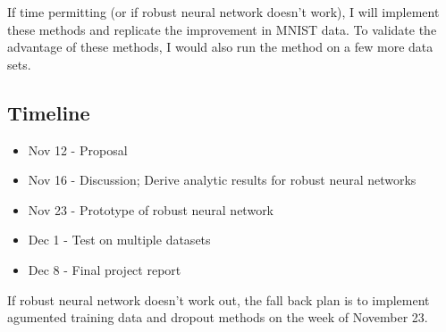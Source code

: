 \documentclass[twoside,12pt]{article}
\begin{document}
If time permitting (or if robust neural network doesn't work), I will implement these methods and replicate the improvement in MNIST data. To validate the advantage of these methods, I would also run the method on a few more data sets.


\subsection{Timeline}
\begin{itemize}
\itemsep0em
\item Nov 12 - Proposal 
\item Nov 16 - Discussion; Derive analytic results for robust neural networks
\item Nov 23 - Prototype of robust neural network
\item Dec 1  - Test on multiple datasets
\item Dec 8  - Final project report
\end{itemize}

If robust neural network doesn't work out, the fall back plan is to implement agumented training data and dropout methods on the week of November 23.


\end{document}
